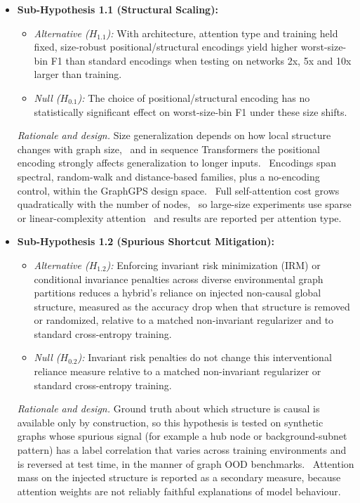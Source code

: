 \documentclass[a4paper,10pt]{article}
\begin{document}
\begin{itemize}
    \item \textbf{Sub-Hypothesis 1.1 (Structural Scaling):}
    \begin{itemize}
        \item \emph{Alternative ($H_{1.1}$):} With architecture, attention type and training held fixed, size-robust positional/structural encodings yield higher worst-size-bin F1 than standard encodings when testing on networks 2x, 5x and 10x larger than training.
        \item \emph{Null ($H_{0.1}$):} The choice of positional/structural encoding has no statistically significant effect on worst-size-bin F1 under these size shifts.
    \end{itemize}
    \emph{Rationale and design.} Size generalization depends on how local structure changes with graph size,~\cite{yehudai2021size} and in sequence Transformers the positional encoding strongly affects generalization to longer inputs.~\cite{kazemnejad2023pe} Encodings span spectral, random-walk and distance-based families, plus a no-encoding control, within the GraphGPS design space.~\cite{rampasek2022graphgps} Full self-attention cost grows quadratically with the number of nodes,~\cite{vaswani2017attention} so large-size experiments use sparse or linear-complexity attention~\cite{rampasek2022graphgps,shirzad2023exphormer} and results are reported per attention type.

    \item \textbf{Sub-Hypothesis 1.2 (Spurious Shortcut Mitigation):}
    \begin{itemize}
        \item \emph{Alternative ($H_{1.2}$):} Enforcing invariant risk minimization (IRM) or conditional invariance penalties across diverse environmental graph partitions reduces a hybrid's reliance on injected non-causal global structure, measured as the accuracy drop when that structure is removed or randomized, relative to a matched non-invariant regularizer and to standard cross-entropy training.
        \item \emph{Null ($H_{0.2}$):} Invariant risk penalties do not change this interventional reliance measure relative to a matched non-invariant regularizer or standard cross-entropy training.
    \end{itemize}
    \emph{Rationale and design.} Ground truth about which structure is causal is available only by construction, so this hypothesis is tested on synthetic graphs whose spurious signal (for example a hub node or background-subnet pattern) has a label correlation that varies across training environments and is reversed at test time, in the manner of graph OOD benchmarks.~\cite{wu2022dir,wu2022eerm,gui2022good} Attention mass on the injected structure is reported as a secondary measure, because attention weights are not reliably faithful explanations of model behaviour.~\cite{jain2019attention,wiegreffe2019attention}
\end{itemize}
\end{document}
